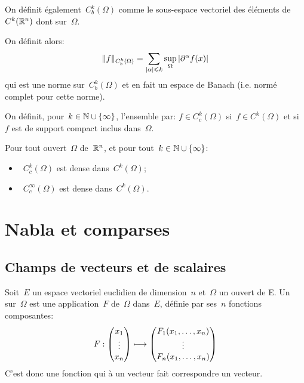 \bigskip{}
On définit également~$C^k_b(\Omega)$ comme le sous-espace vectoriel des éléments de~$C^k(\mathbb R^n)$ dont  sur~$\Omega$.

On définit alors:
\begin{equation}
\|f\|_{C^k_b(\Omega)}=\displaystyle\sum_{|\alpha|\leqslant k} \sup_{\Omega} |\partial^\alpha f(x)|
\end{equation}
qui est une norme sur~$C^k_b(\Omega)$ et en fait un espace de Banach (i.e. normé complet pour cette norme).

\medskip
\begin{definition}\label{Def-Cc}
On définit, pour~$k\in\mathbb N\cup\{\infty\}$, l'ensemble  par:
$f\in C_c^k(\Omega)$ si~$f\in C^k(\Omega)$ et si~$f$ est de support compact inclus dans~$\Omega$.
\end{definition}
Pour tout ouvert~$\Omega$ de~$\mathbb R^n$, et pour tout~$k\in\mathbb N\cup\{\infty\}$:
\begin{itemize}
  \item~$C_c^k(\Omega)$ est dense dans~$C^k(\Omega)$;
  \item~$C_c^\infty(\Omega)$ est dense dans~$C^k(\Omega)$.
\end{itemize}

\medskip
\section{Nabla et comparses}\label{Sec-nabla}

\subsection{Champs de vecteurs et de scalaires}

\begin{definition}
Soit~$E$ un espace vectoriel euclidien de dimension~$n$ et~$\Omega$ un ouvert de E.
Un  sur~$\Omega$ est une application~$F$ de~$\Omega$ dans~$E$, définie par ses~$n$ fonctions composantes:
\begin{equation}
  F: \VV*{x_1\\\vdots\\x_n} \longmapsto \VV*{F_1(x_1,\dots,x_n)\\ \vdots\\ F_n(x_1,\dots,x_n)}
\end{equation}
C'est donc une fonction qui à un vecteur fait correspondre un vecteur.
\end{definition}

